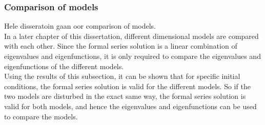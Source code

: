 \documentclass[../../main.tex]{subfiles}
\begin{document}
\subsubsection{Comparison of models}
Hele disseratoin gaan oor comparison of models. \\


In a later chapter of this dissertation, different dimensional models are compared with each other. Since the formal series solution is a linear combination of eigenvalues and eigenfunctions, it is only required to compare the eigenvalues and eigenfunctions of the different models.\\

Using the results of this subsection, it can be shown that for specific initial conditions, the formal series solution is valid for the different models. So if the two models are disturbed in the exact same way, the formal series solution is valid for both models, and hence the eigenvalues and eigenfunctions can be used to compare the models.\\
\end{document}
